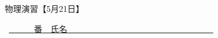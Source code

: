 \documentclass[a4paper,9pt]{jsarticle}
\begin{document}
\hakosyokika
\begin{center}
{\Large 物理演習【5月21日】}
\end{center}
\hfill ~\underline{~~~~~~番　氏名~~~~~~~~~~~~~~~~~~~~~~~~~~~~~~~~~~~}
\hakosyokika
\begin{enumerate}
    
\vfill
    
\vfill
\newpage
    
\newpage
    
\newpage
    
%     
%     
%     
% 
\vfill
\end{enumerate}
\end{document}
